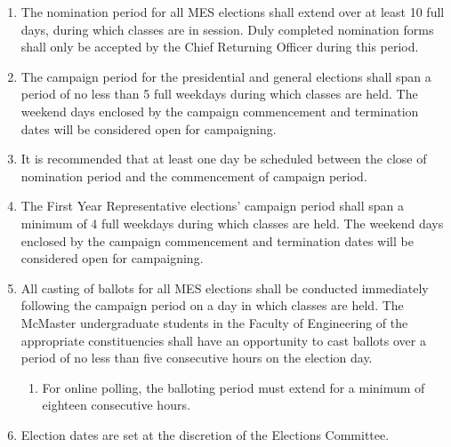\begin{enumerate}
 \item
  The nomination period for all MES elections shall extend over at least
  10 full days, during which classes are in session. Duly completed
  nomination forms shall only be accepted by the Chief Returning Officer
  during this period.
 \item
  The campaign period for the presidential and general elections shall
  span a period of no less than 5 full weekdays during which classes are
  held. The weekend days enclosed by the campaign commencement and
  termination dates will be considered open for campaigning.
 \item
  It is recommended that at least one day be scheduled between the close
  of nomination period and the commencement of campaign period.
 \item
  The First Year Representative elections' campaign period shall span a
  minimum of 4 full weekdays during which classes are held. The weekend
  days enclosed by the campaign commencement and termination dates will
  be considered open for campaigning.
 \item
  All casting of ballots for all MES elections shall be conducted
  immediately following the campaign period on a day in which classes
  are held. The McMaster undergraduate students in the Faculty of
  Engineering of the appropriate constituencies shall have an
  opportunity to cast ballots over a period of no less than five
  consecutive hours on the election day.

  \begin{enumerate}
   \item
    For online polling, the balloting period must extend for a minimum
    of eighteen consecutive hours.
  \end{enumerate}
 \item
  Election dates are set at the discretion of the Elections Committee. %

\end{enumerate}
